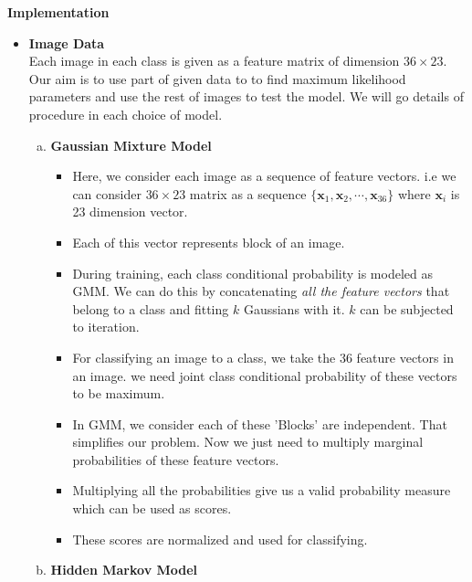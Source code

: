 \documentclass[11pt,paper=a4,answers]{exam}
\renewcommand{\vec}[1]{\mathbf{#1}}
\begin{document}
\begin{questions}
\question \textbf{Implementation}
\begin{itemize}
    \item \textbf{Image Data}\\
    Each image in each class is given as a feature matrix of dimension $36 \times 23$. Our aim is to use part of given data to to find maximum likelihood parameters and use the rest of images to test the model. We will go details of procedure in each choice of model.
    \begin{enumerate}[a.]
        \item \textbf{Gaussian Mixture Model}
        \noindent
        \begin{itemize}
            \item Here, we consider each image as a sequence of feature vectors. i.e we can consider $36 \times 23$ matrix as a sequence $\{\vec{x}_1, \vec{x}_2, \cdots, \vec{x}_{36}\}$ where $\vec{x}_i$ is 23 dimension vector.
            \item Each of this vector represents block of an image.
            \item During training, each class conditional probability is modeled as GMM. We can do this by concatenating \textit{all the feature vectors} that belong to a class and fitting $k$ Gaussians with it. $k$ can be subjected to iteration.
            \item For classifying an image to a class, we take the 36 feature vectors in an image. we need joint class conditional probability of these vectors to be maximum.
            \item In GMM, we consider each of these 'Blocks' are independent. That simplifies our problem. Now we just need to multiply marginal probabilities of these feature vectors.
            \item Multiplying all the probabilities give us a valid probability measure which can be used as scores.
            \item These scores are normalized and used for classifying.
        \end{itemize}
        \item \textbf{Hidden Markov Model}
    \end{enumerate}



\end{itemize}
\end{questions}
\end{document}
